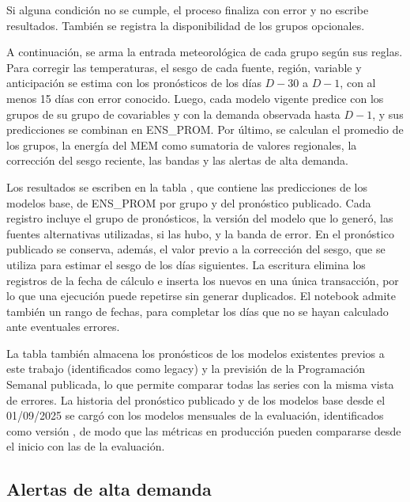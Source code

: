 Si alguna condición no se cumple, el proceso finaliza con error y no escribe resultados. También se registra la disponibilidad de los grupos opcionales.

A continuación, se arma la entrada meteorológica de cada grupo según sus reglas. Para corregir las temperaturas, el sesgo de cada fuente, región, variable y anticipación se estima con los pronósticos de los días $D-30$ a $D-1$, con al menos 15 días con error conocido. Luego, cada modelo vigente predice con los grupos de su grupo de covariables y con la demanda observada hasta $D-1$, y sus predicciones se combinan en ENS\_PROM. Por último, se calculan el promedio de los grupos, la energía del MEM como sumatoria de valores regionales, la corrección del sesgo reciente, las bandas y las alertas de alta demanda.

Los resultados se escriben en la tabla , que contiene las predicciones de los modelos base, de ENS\_PROM por grupo y del pronóstico publicado. Cada registro incluye el grupo de pronósticos, la versión del modelo que lo generó, las fuentes alternativas utilizadas, si las hubo, y la banda de error. En el pronóstico publicado se conserva, además, el valor previo a la corrección del sesgo, que se utiliza para estimar el sesgo de los días siguientes. La escritura elimina los registros de la fecha de cálculo e inserta los nuevos en una única transacción, por lo que una ejecución puede repetirse sin generar duplicados. El notebook admite también un rango de fechas, para completar los días que no se hayan calculado ante eventuales errores.

La tabla también almacena los pronósticos de los modelos existentes previos a este trabajo (identificados como legacy) y la previsión de la Programación Semanal publicada, lo que permite comparar todas las series con la misma vista de errores. La historia del pronóstico publicado y de los modelos base desde el 01/09/2025 se cargó con los modelos mensuales de la evaluación, identificados como versión , de modo que las métricas en producción pueden compararse desde el inicio con las de la evaluación.

\subsection{Alertas de alta demanda}
\label{subsec:alertas_alta_demanda}

